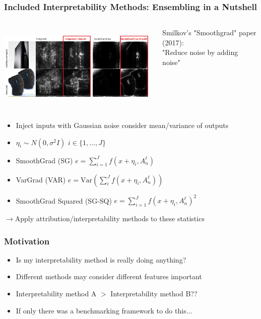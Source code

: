 \documentclass{beamer}
\theoremstyle{mystyle}
\begin{document}
\begin{frame}
    \frametitle{Included Interpretability Methods: Ensembling in a Nutshell}
    \begin{columns}[T] %
        \begin{column}{0.7\textwidth}
            \includegraphics[width=1.0\textwidth, height=4cm]{compareSGBP.png}
        \end{column}
        \begin{column}{0.3\textwidth}
		Smilkov's "Smoothgrad" paper (2017): \\
		"Reduce noise by adding noise"
        \end{column}
    \end{columns}
    \begin{itemize}
        \item Inject inputs with Gaussian noise consider mean/variance of outputs \pause
        \item $\eta_i \sim N(0, \sigma ^2 I)$ $i\in \{1,\ldots, J\} $ \pause
        \item SmoothGrad (SG) $e = \sum_{i=1}^{J} {f( x + \eta_i, A_n^{\ell}) }$ \pause
        \item VarGrad (VAR) $e = \text{Var}\left(  \sum_{i}^{J} {f(x + \eta_i, A_n^{\ell})}\right) $ \pause
        \item SmoothGrad Squared (SG-SQ) $e = \sum_{i=1}^{J} {f( x + \eta_i, A_n^{\ell})^{2} }$\pause
    \end{itemize}
$\to$Apply attribution/interpretability methods to these statistics
\end{frame}




\begin{frame}
	\frametitle{Motivation}
	\begin{itemize}
		\item Is my interpretability method is really doing anything? \pause
		\item Different methods may consider different features important \pause
		\item Interpretability method A $>$ Interpretability method B??\pause
		\item If only there was a benchmarking framework to do this...
	\end{itemize}
\end{frame}
\end{document}
